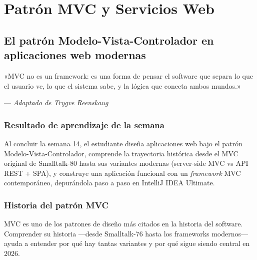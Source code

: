 \documentclass[11pt,a4paper,openany]{book}
\begin{document}
\part{Patrón MVC y Servicios Web}
\label{parte:unidad4}

\chapter{El patrón Modelo-Vista-Controlador en aplicaciones web modernas}
\label{cap:semana14}

\epigraph{«MVC no es un framework: es una forma de pensar el software
que separa lo que el usuario ve, lo que el sistema sabe, y la lógica
que conecta ambos mundos.»}{--- \textit{Adaptado de Trygve Reenskaug}}

\section*{Resultado de aprendizaje de la semana}
Al concluir la semana 14, el estudiante diseña aplicaciones web bajo
el patrón Modelo-Vista-Controlador, comprende la trayectoria histórica
desde el MVC original de Smalltalk-80 hasta sus variantes modernas
(server-side MVC vs API REST + SPA), y construye una aplicación
funcional con un \emph{framework} MVC contemporáneo, depurándola paso
a paso en IntelliJ IDEA Ultimate.

\section{Historia del patrón MVC}

MVC es uno de los patrones de diseño más citados en la
historia del software. Comprender su historia ---desde Smalltalk-76
hasta los frameworks modernos--- ayuda a entender por qué hay tantas
variantes y por qué sigue siendo central en 2026.
\end{document}
